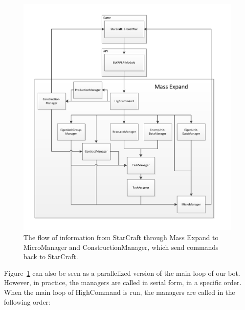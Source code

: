 \begin{figure}[htb]
\centering
\includegraphics[width=\textwidth, trim= 0mm 10mm 0mm 10mm, clip]{images/flowofinformation}
\caption{The flow of information from StarCraft through Mass Expand to Micro\-Manager and Construction\-Manager, which send commands back to StarCraft.}
\label{fig:flowofinformation}
\end{figure}

Figure~\ref{fig:flowofinformation} can also be seen as a parallelized version of the main loop of our bot. However, in practice, the managers are called in serial form, in a specific order. When the main loop of HighCommand is run, the managers are called in the following order:

